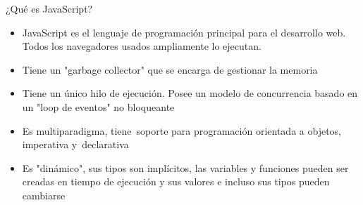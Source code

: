 \documentclass[aspectratio=43,10pt,t]{beamer}
\begin{document}
\begin{utnfondo}
\end{utnfondo}

\begin{frame}{¿Qué es JavaScript?}\relax
\begingroup
{}
\begin{itemize}
  \item {\fontsize{11.3}{14.0}\selectfont JavaScript es el lenguaje de programación principal para el desarrollo web. Todos los navegadores usados ampliamente lo ejecutan.\par}
  \item {\fontsize{12.2}{15.1}\selectfont Tiene un "garbage collector" que se encarga de gestionar la memoria\par}
  \item {\fontsize{12.2}{15.1}\selectfont Tiene un único hilo de ejecución. Posee un modelo de concurrencia basado en un "loop de eventos" no bloqueante\par}
  \item {\fontsize{12.2}{15.1}\selectfont Es multiparadigma, tiene~soporte para programación orientada a objetos, imperativa y~declarativa\par}
  \item {\fontsize{12.2}{15.1}\selectfont Es "dinámico", sus tipos son implícitos, las variables y funciones pueden ser creadas en tiempo de ejecución y sus valores e incluso sus tipos pueden cambiarse\par}
\end{itemize}
\endgroup
{}
\end{frame}
\end{document}
